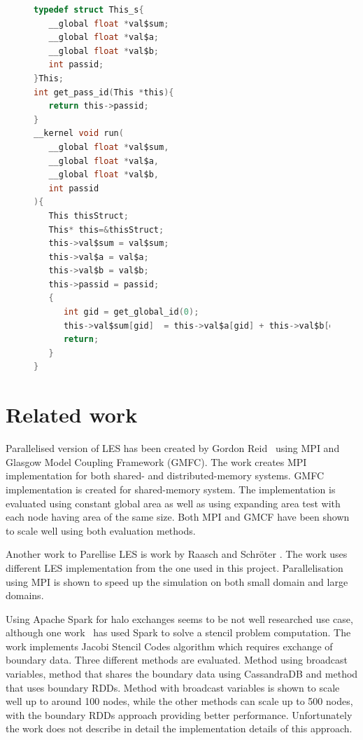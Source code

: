 \documentclass{l4proj}
\begin{document}
\begin{figure}
  \begin{lstlisting}[language=C]
typedef struct This_s{
   __global float *val$sum;
   __global float *val$a;
   __global float *val$b;
   int passid;
}This;
int get_pass_id(This *this){
   return this->passid;
}
__kernel void run(
   __global float *val$sum, 
   __global float *val$a, 
   __global float *val$b, 
   int passid
){
   This thisStruct;
   This* this=&thisStruct;
   this->val$sum = val$sum;
   this->val$a = val$a;
   this->val$b = val$b;
   this->passid = passid;
   {
      int gid = get_global_id(0);
      this->val$sum[gid]  = this->val$a[gid] + this->val$b[gid];
      return;
   }
}   
  \end{lstlisting}
\end{figure}

\section{Related work}

Parallelised version of LES has been created by Gordon Reid~\cite{les_mpi} using MPI
and Glasgow Model Coupling Framework (GMFC). The work creates MPI implementation for both shared-
and distributed-memory systems. GMFC implementation is created for shared-memory system.
The implementation is evaluated using constant global area as well as using expanding area
test with each node having area of the same size. Both MPI and GMCF have been shown
to scale well using both evaluation methods.

Another work to Parellise LES is work by Raasch and Schröter \cite{les_palm}. The work
uses different LES implementation from the one used in this project. Parallelisation
using MPI is shown to speed up the simulation on both small domain and large domains.

Using Apache Spark for halo exchanges seems to be not well researched use case, although
one work~\cite{seismic_spark} has used Spark to solve a stencil problem computation. 
The work implements Jacobi Stencil Codes algorithm which requires exchange of boundary
data. Three different methods are evaluated. Method using broadcast variables, method
that shares the boundary data using CassandraDB and method that uses boundary RDDs.
Method with broadcast variables is shown to scale well up to around 100 nodes, while
the other methods can scale up to 500 nodes, with the boundary RDDs approach providing
better performance. Unfortunately the work does not describe in detail the implementation
details of this approach.
\end{document}

